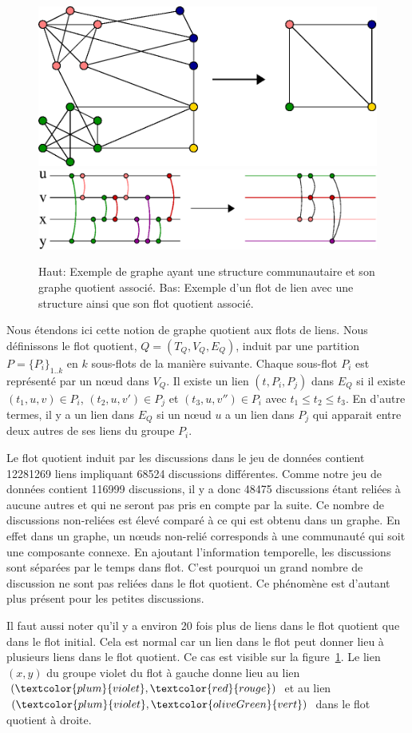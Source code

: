 \begin{figure}
\centering
	\includegraphics[width=0.50\linewidth]{img/mailing/graph-quotient}
	\vfill
	\includegraphics[width=0.75\linewidth]{img/mailing/stream-quotient}
	\caption{Haut: Exemple de graphe ayant une structure communautaire et son graphe quotient associé. Bas: Exemple d'un flot de lien avec une structure ainsi que son flot quotient associé.}
	\label{fig:graph-quotient}
\end{figure}

Nous étendons ici cette notion de graphe quotient aux flots de liens.
Nous définissons le flot quotient, $Q=(T_Q,V_Q,E_Q)$, induit par une partition $P=\{{P_i}\}_{1..k}$ en $k$ sous-flots de la manière suivante.
Chaque sous-flot $P_i$ est représenté par un n\oe ud dans $V_Q$.
Il existe un lien $(t,P_i,P_j)$ dans $E_Q$ si il existe $(t_1,u,v) \in P_i$, $(t_2,u,v') \in P_j$ et $(t_3,u,v'') \in P_i$ avec $t_1 \leq t_2 \leq t_3$.
En d'autre termes, il y a un lien dans $E_Q$ si un n\oe ud $u$ a un lien dans $P_j$ qui apparait entre deux autres de ses liens du groupe $P_i$.

Le flot quotient induit par les discussions dans le jeu de données contient 12281269 liens impliquant 68524 discussions différentes.
Comme notre jeu de données contient 116999 discussions, il y a donc 48475 discussions étant reliées à aucune autres et qui ne seront pas pris en compte par la suite.
Ce nombre de discussions non-reliées est élevé comparé à ce qui est obtenu dans un graphe. En effet dans un graphe, un n\oe uds non-relié corresponds à une communauté qui soit une composante connexe.
En ajoutant l'information temporelle, les discussions sont séparées par le temps dans flot.
C'est pourquoi un grand nombre de discussion ne sont pas reliées dans le flot quotient.
Ce phénomène est d'autant plus présent pour les petites discussions.

Il faut aussi noter qu'il y a environ 20 fois plus de liens dans le flot quotient que dans le flot initial.
Cela est normal car un lien dans le flot peut donner lieu à plusieurs liens dans le flot quotient.
Ce cas est visible sur la figure~\ref{fig:graph-quotient}. 
Le lien $(x,y)$ du groupe violet du flot à gauche donne lieu au lien $(\textcolor{plum}{violet}, \textcolor{red}{rouge})$ et au lien $(\textcolor{plum}{violet}, \textcolor{oliveGreen}{vert})$ dans le flot quotient à droite. 

